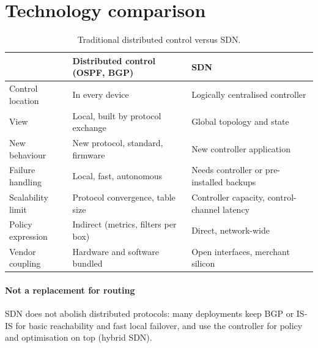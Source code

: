 \documentclass[11pt,a4paper]{article}
\begin{document}
\section{Technology comparison}
\begin{table}[htbp]
\centering\small
\caption{Traditional distributed control versus SDN.}\label{tab:cmp}
\begin{tabularx}{\linewidth}{@{}l Y Y@{}}
\toprule
{} & Distributed control (OSPF, BGP) & SDN \\
\midrule
Control location   & In every device                 & Logically centralised controller \\
View               & Local, built by protocol exchange & Global topology and state \\
New behaviour      & New protocol, standard, firmware & New controller application \\
Failure handling   & Local, fast, autonomous          & Needs controller or pre-installed backups \\
Scalability limit  & Protocol convergence, table size & Controller capacity, control-channel latency \\
Policy expression  & Indirect (metrics, filters per box) & Direct, network-wide \\
Vendor coupling    & Hardware and software bundled    & Open interfaces, merchant silicon \\
\bottomrule
\end{tabularx}
\end{table}

\paragraph{Not a replacement for routing} SDN does not abolish distributed protocols: many deployments keep BGP or
IS-IS for basic reachability and fast local failover, and use the controller for policy and optimisation on top
(hybrid SDN).

\end{document}
